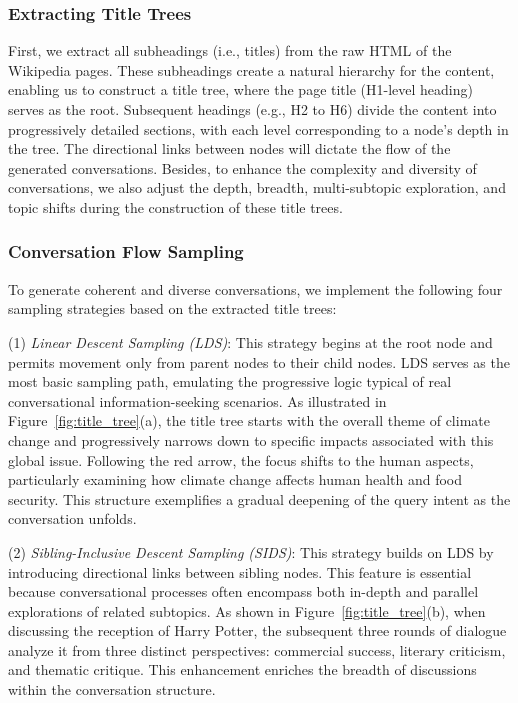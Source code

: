 \documentclass[11pt]{article}
\begin{document}
\subsubsection{Extracting Title Trees}
First, we extract all subheadings (i.e., titles) from the raw HTML of the Wikipedia pages. These subheadings create a natural hierarchy for the content, enabling us to construct a title tree, where the page title (H1-level heading) serves as the root. Subsequent headings (e.g., H2 to H6) divide the content into progressively detailed sections, with each level corresponding to a node's depth in the tree. The directional links between nodes will dictate the flow of the generated conversations.
Besides, to enhance the complexity and diversity of conversations, we also adjust the depth, breadth, multi-subtopic exploration, and topic shifts during the construction of these title trees.

\subsubsection{Conversation Flow Sampling}\label{sec:conv_flow}
To generate coherent and diverse conversations, we implement the following four sampling strategies based on the extracted title trees:

(1) \textit{Linear Descent Sampling (LDS)}: This strategy begins at the root node and permits movement only from parent nodes to their child nodes. LDS serves as the most basic sampling path, emulating the progressive logic typical of real conversational information-seeking scenarios. As illustrated in Figure~\ref{fig:title_tree}(a), the title tree starts with the overall theme of climate change and progressively narrows down to specific impacts associated with this global issue. Following the red arrow, the focus shifts to the human aspects, particularly examining how climate change affects human health and food security. This structure exemplifies a gradual deepening of the query intent as the conversation unfolds.

(2) \textit{Sibling-Inclusive Descent Sampling (SIDS)}: This strategy builds on LDS by introducing directional links between sibling nodes. This feature is essential because conversational processes often encompass both in-depth and parallel explorations of related subtopics.
As shown in Figure~\ref{fig:title_tree}(b), when discussing the reception of Harry Potter, the subsequent three rounds of dialogue analyze it from three distinct perspectives: commercial success, literary criticism, and thematic critique. This enhancement enriches the breadth of discussions within the conversation structure.
\end{document}
